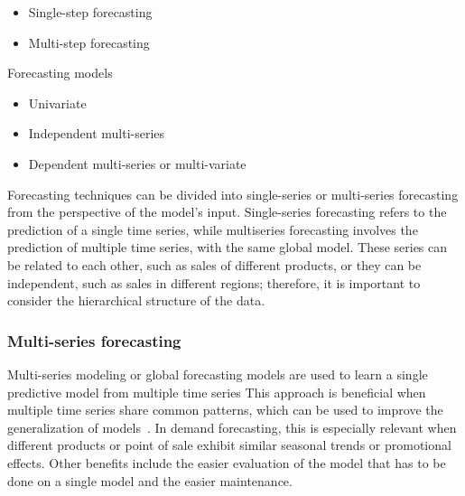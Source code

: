 




\begin{itemize}
    \item Single-step forecasting
    \item Multi-step forecasting
\end{itemize}

Forecasting models
\begin{itemize}
    \item Univariate
    \item Independent multi-series
    \item Dependent multi-series or multi-variate
\end{itemize}

Forecasting techniques can be divided into single-series or multi-series forecasting from the perspective of the model's input.
Single-series forecasting refers to the prediction of a single time series, while multiseries forecasting involves the prediction of multiple time series, with the same global model\cite{joachim2023demand}.
These series can be related to each other, such as sales of different products, or they can be independent, such as sales in different regions; therefore, it is important to consider the hierarchical structure of the data.

\subsubsection{Multi-series forecasting}
Multi-series modeling or global forecasting models are used to learn a single predictive model from multiple time series \cite{januschowski2020criteria}
This approach is beneficial when multiple time series share common patterns, which can be used to improve the generalization of models~\cite{Buonanno2022}.
In demand forecasting, this is especially relevant when different products or point of sale exhibit similar seasonal trends or promotional effects.
Other benefits include the easier evaluation of the model that has to be done on a single model and the easier maintenance.




